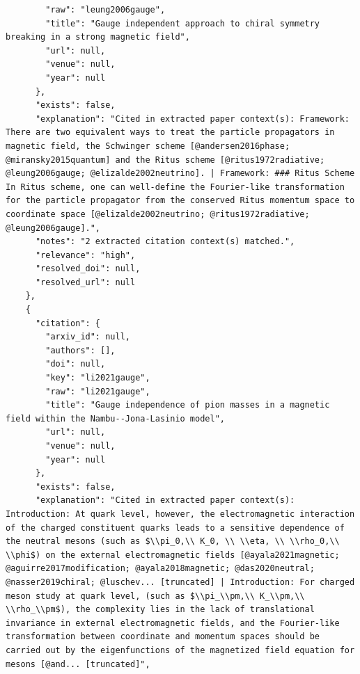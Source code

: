 \documentclass[11pt]{article}
\begin{document}
\begin{verbatim}
        "raw": "leung2006gauge",
        "title": "Gauge independent approach to chiral symmetry breaking in a strong magnetic field",
        "url": null,
        "venue": null,
        "year": null
      },
      "exists": false,
      "explanation": "Cited in extracted paper context(s): Framework: There are two equivalent ways to treat the particle propagators in magnetic field, the Schwinger scheme [@andersen2016phase; @miransky2015quantum] and the Ritus scheme [@ritus1972radiative; @leung2006gauge; @elizalde2002neutrino]. | Framework: ### Ritus Scheme In Ritus scheme, one can well-define the Fourier-like transformation for the particle propagator from the conserved Ritus momentum space to coordinate space [@elizalde2002neutrino; @ritus1972radiative; @leung2006gauge].",
      "notes": "2 extracted citation context(s) matched.",
      "relevance": "high",
      "resolved_doi": null,
      "resolved_url": null
    },
    {
      "citation": {
        "arxiv_id": null,
        "authors": [],
        "doi": null,
        "key": "li2021gauge",
        "raw": "li2021gauge",
        "title": "Gauge independence of pion masses in a magnetic field within the Nambu--Jona-Lasinio model",
        "url": null,
        "venue": null,
        "year": null
      },
      "exists": false,
      "explanation": "Cited in extracted paper context(s): Introduction: At quark level, however, the electromagnetic interaction of the charged constituent quarks leads to a sensitive dependence of the neutral mesons (such as $\\pi_0,\\ K_0, \\ \\eta, \\ \\rho_0,\\ \\phi$) on the external electromagnetic fields [@ayala2021magnetic; @aguirre2017modification; @ayala2018magnetic; @das2020neutral; @nasser2019chiral; @luschev... [truncated] | Introduction: For charged meson study at quark level, (such as $\\pi_\\pm,\\ K_\\pm,\\ \\rho_\\pm$), the complexity lies in the lack of translational invariance in external electromagnetic fields, and the Fourier-like transformation between coordinate and momentum spaces should be carried out by the eigenfunctions of the magnetized field equation for mesons [@and... [truncated]",

\end{verbatim}
\end{document}

